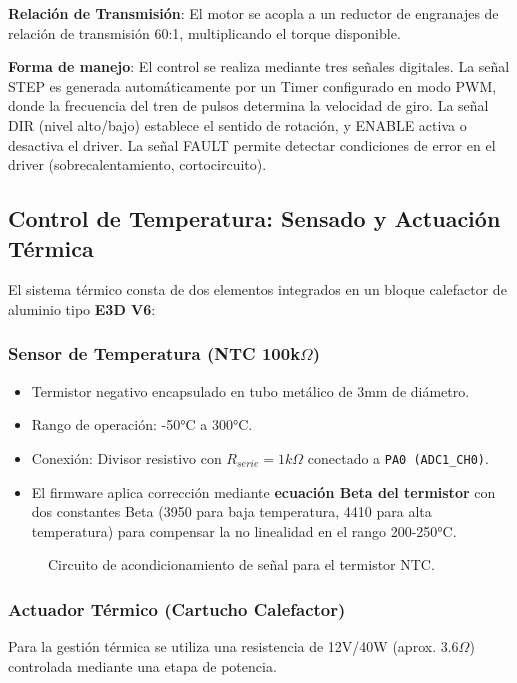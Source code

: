 \documentclass[12pt]{article}
\begin{document}
\textbf{Relación de Transmisión}: El motor se acopla a un reductor de engranajes de relación de transmisión 60:1, multiplicando el torque disponible.

\textbf{Forma de manejo}: El control se realiza mediante tres señales digitales. La señal STEP es generada automáticamente por un Timer configurado en modo PWM, donde la frecuencia del tren de pulsos determina la velocidad de giro. La señal DIR (nivel alto/bajo) establece el sentido de rotación, y ENABLE activa o desactiva el driver. La señal FAULT permite detectar condiciones de error en el driver (sobrecalentamiento, cortocircuito).

\subsection{Control de Temperatura: Sensado y Actuación Térmica}
El sistema térmico consta de dos elementos integrados en un bloque calefactor de aluminio tipo \textbf{E3D V6}:

\subsubsection{Sensor de Temperatura (NTC 100k$\Omega$)}
\begin{itemize}
    \item Termistor negativo encapsulado en tubo metálico de 3mm de diámetro.
    \item Rango de operación: -50°C a 300°C.
    \item Conexión: Divisor resistivo con $R_{serie} = 1k\Omega$ conectado a \texttt{PA0 (ADC1\_CH0)}.
    \item El firmware aplica corrección mediante \textbf{ecuación Beta del termistor} con dos constantes Beta (3950 para baja temperatura, 4410 para alta temperatura) para compensar la no linealidad en el rango 200-250°C.
\end{itemize}

\begin{figure}[H]
    \centering
    \caption{Circuito de acondicionamiento de señal para el termistor NTC.}
    \label{fig:circuito_ntc}
\end{figure}

\subsubsection{Actuador Térmico (Cartucho Calefactor)}
Para la gestión térmica se utiliza una resistencia de 12V/40W (aprox. $3.6\Omega$) controlada mediante una etapa de potencia.
\end{document}
